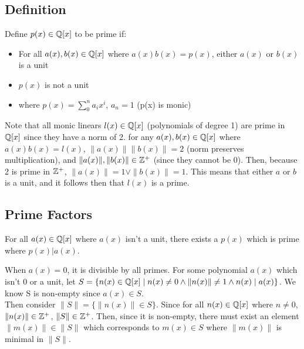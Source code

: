 
\subsection{Definition}

Define $p(x)\in\mathbb{Q}[x]$ to be prime if:

\begin{itemize}
    \item For all $a(x),b(x)\in\mathbb{Q}[x]$ where $a(x)b(x)=p(x)$, either $a(x)$ or $b(x)$ is a unit
    \item $p(x)$ is not a unit
    \item where $p(x)=\sum_{0}^{n} a_i x^i$, $a_n=1$ (p(x) is monic)
\end{itemize}

Note that all monic linears $l(x)\in\mathbb{Q}[x]$ (polynomials of degree 1) are prime in $\mathbb{Q}[x]$ since they have a norm of 2. for any $a(x),b(x)\in\mathbb{Q}[x]$ where $a(x)b(x)=l(x)$, $\|a(x)\|\|b(x)\|=2$ (norm preserves multiplication), and $\|a(x)\|,\|b(x)\|\in\mathbb{Z}^+$ (since they cannot be 0). Then, because 2 is prime in $\mathbb{Z}^+$, $\|a(x)\|=1\lor\|b(x)\|=1$. This means that either $a$ or $b$ is a unit, and it follows then that $l(x)$ is a prime.


\subsection{Prime Factors}

\begin{theorem}
    For all $a(x)\in\mathbb{Q}[x]$ where $a(x)$ isn't a unit, there exists a $p(x)$ which is prime where $p(x)|a(x)$.\\
\end{theorem}
    

When $a(x)=0$, it is divisible by all primes. For some polynomial $a(x)$ which isn't 0 or a unit, let $S=\{n(x)\in\mathbb{Q}[x]\mid n(x)\neq0\land\|{n(x)}\|\neq1\land n(x)\mid a(x)\}$. We know S is non-empty since $a(x)\in S$.\\

Then consider $\|S\|=\{\|n(x)\|\in S\}$. Since for all $n(x)\in\mathbb{Q}[x]$ where $n\neq0$, $\|n(x)\|\in\mathbb{Z}^+$, $\|S\|\in\mathbb{Z}^+$. Then, since it is non-empty, there must exist an element $\|m(x)\|\in\|S\|$ which corresponds to $m(x)\in S$ where $\|m(x)\|$ is minimal in $\|S\|$.\\

